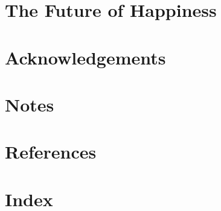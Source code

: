\documentclass[a4paper,14pt]{extarticle}
\begin{document}
\newpage
\section{The Future of Happiness}

\newpage
\section{Acknowledgements}

\newpage
\section{Notes}

\newpage
\section{References}

\newpage
\section{Index}
\end{document}
